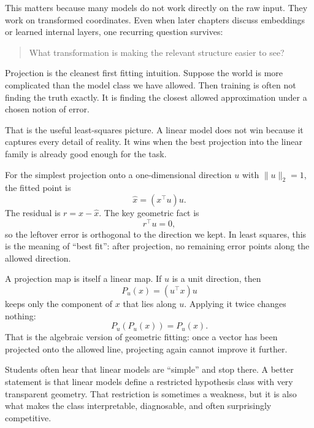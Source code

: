 This matters because many models do not work directly on the raw input. They work on transformed coordinates. Even when later chapters discuss embeddings or learned internal layers, one recurring question survives:

\begin{quote}
What transformation is making the relevant structure easier to see?
\end{quote}

Projection is the cleanest first fitting intuition. Suppose the world is more complicated than the model class we have allowed. Then training is often not finding the truth exactly. It is finding the closest allowed approximation under a chosen notion of error.

That is the useful least-squares picture. A linear model does not win because it captures every detail of reality. It wins when the best projection into the linear family is already good enough for the task.

\begin{mathlens}
For the simplest projection onto a one-dimensional direction \(u\) with \(\|u\|_2=1\), the fitted point is
\[
\hat{x}=(x^\top u)u.
\]
The residual is \(r=x-\hat{x}\). The key geometric fact is
\[
r^\top u=0,
\]
so the leftover error is orthogonal to the direction we kept. In least squares, this is the meaning of ``best fit'': after projection, no remaining error points along the allowed direction.
\end{mathlens}

\begin{mathlens}
A projection map is itself a linear map. If \(u\) is a unit direction, then
\[
P_u(x)=(u^\top x)u
\]
keeps only the component of \(x\) that lies along \(u\). Applying it twice changes nothing:
\[
P_u(P_u(x))=P_u(x).
\]
That is the algebraic version of geometric fitting: once a vector has been projected onto the allowed line, projecting again cannot improve it further.
\end{mathlens}

\begin{advancednote}
Students often hear that linear models are ``simple'' and stop there. A better statement is that linear models define a restricted hypothesis class with very transparent geometry. That restriction is sometimes a weakness, but it is also what makes the class interpretable, diagnosable, and often surprisingly competitive.
\end{advancednote}


